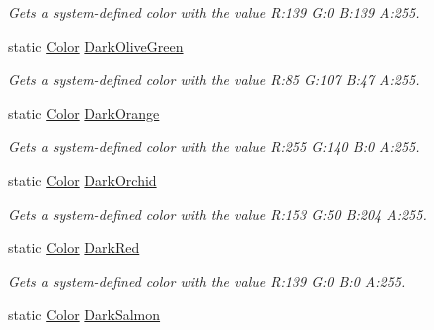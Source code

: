 \begin{DoxyCompactItemize}
\begin{DoxyCompactList}\small\item\em Gets a system-\/defined color with the value R\+:139 G\+:0 B\+:139 A\+:255.\end{DoxyCompactList}\item 
static \hyperlink{structMicrosoft_1_1Xna_1_1Framework_1_1Color}{Color} \hyperlink{structMicrosoft_1_1Xna_1_1Framework_1_1Color_a47a7708284bbf5a7922dfe2c95257025}{Dark\+Olive\+Green}
\begin{DoxyCompactList}\small\item\em Gets a system-\/defined color with the value R\+:85 G\+:107 B\+:47 A\+:255.\end{DoxyCompactList}\item 
static \hyperlink{structMicrosoft_1_1Xna_1_1Framework_1_1Color}{Color} \hyperlink{structMicrosoft_1_1Xna_1_1Framework_1_1Color_aa393145d85a06647f89b1c6b4ec80da8}{Dark\+Orange}
\begin{DoxyCompactList}\small\item\em Gets a system-\/defined color with the value R\+:255 G\+:140 B\+:0 A\+:255.\end{DoxyCompactList}\item 
static \hyperlink{structMicrosoft_1_1Xna_1_1Framework_1_1Color}{Color} \hyperlink{structMicrosoft_1_1Xna_1_1Framework_1_1Color_a74f6f72dadaf4e2fe0b18f6d6fd2dc89}{Dark\+Orchid}
\begin{DoxyCompactList}\small\item\em Gets a system-\/defined color with the value R\+:153 G\+:50 B\+:204 A\+:255.\end{DoxyCompactList}\item 
static \hyperlink{structMicrosoft_1_1Xna_1_1Framework_1_1Color}{Color} \hyperlink{structMicrosoft_1_1Xna_1_1Framework_1_1Color_a97617da30d2d878b9772b2272657164c}{Dark\+Red}
\begin{DoxyCompactList}\small\item\em Gets a system-\/defined color with the value R\+:139 G\+:0 B\+:0 A\+:255.\end{DoxyCompactList}\item 
static \hyperlink{structMicrosoft_1_1Xna_1_1Framework_1_1Color}{Color} \hyperlink{structMicrosoft_1_1Xna_1_1Framework_1_1Color_a8d407cb14c2f02b24a29ab1f7e1b90f0}{Dark\+Salmon}

\end{DoxyCompactItemize}
